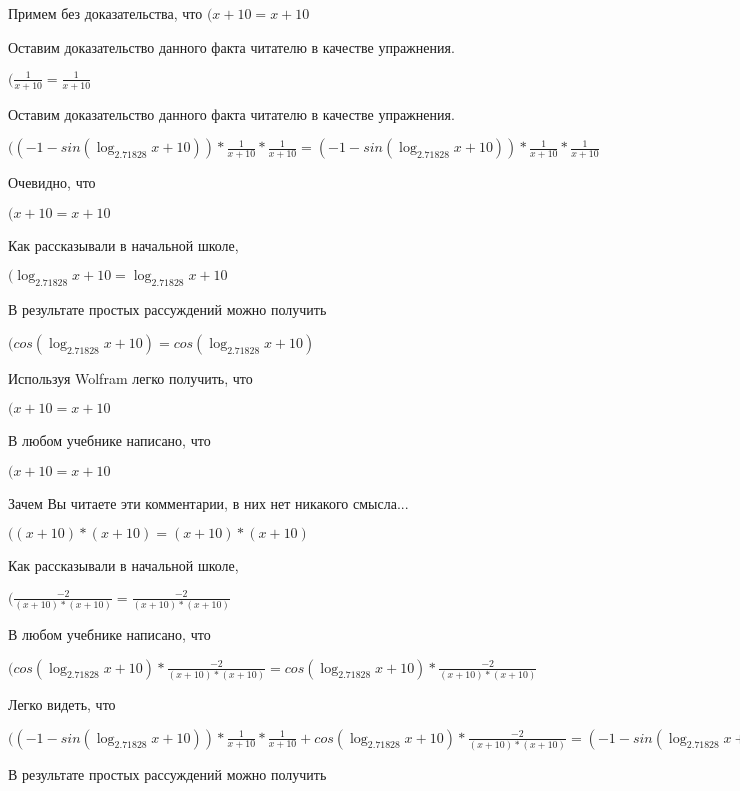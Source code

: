 \documentclass[12pt,a4paper,fleqn]{article}
\theoremstyle{definition}
\begin{document}
Примем без доказательства, что
$( x  +  10  =  x  +  10 $

Оставим доказательство данного факта читателю в качестве упражнения.

$(\frac{ 1 }{ x  +  10 }
 = \frac{ 1 }{ x  +  10 }
$

Оставим доказательство данного факта читателю в качестве упражнения.

$(( -1  - sin(\log_{ 2.71828 }{ x  +  10 })) * \frac{ 1 }{ x  +  10 }
 * \frac{ 1 }{ x  +  10 }
 = ( -1  - sin(\log_{ 2.71828 }{ x  +  10 })) * \frac{ 1 }{ x  +  10 }
 * \frac{ 1 }{ x  +  10 }
$

Очевидно, что

$( x  +  10  =  x  +  10 $

Как рассказывали в начальной школе,

$(\log_{ 2.71828 }{ x  +  10 } = \log_{ 2.71828 }{ x  +  10 }$

В результате простых рассуждений можно получить

$(cos(\log_{ 2.71828 }{ x  +  10 }) = cos(\log_{ 2.71828 }{ x  +  10 })$

Используя Wolfram легко получить, что

$( x  +  10  =  x  +  10 $

В любом учебнике написано, что

$( x  +  10  =  x  +  10 $

Зачем Вы читаете эти комментарии, в них нет никакого смысла...

$(( x  +  10 ) * ( x  +  10 ) = ( x  +  10 ) * ( x  +  10 )$

Как рассказывали в начальной школе,

$(\frac{ -2 }{( x  +  10 ) * ( x  +  10 )}
 = \frac{ -2 }{( x  +  10 ) * ( x  +  10 )}
$

В любом учебнике написано, что

$(cos(\log_{ 2.71828 }{ x  +  10 }) * \frac{ -2 }{( x  +  10 ) * ( x  +  10 )}
 = cos(\log_{ 2.71828 }{ x  +  10 }) * \frac{ -2 }{( x  +  10 ) * ( x  +  10 )}
$

Легко видеть, что

$(( -1  - sin(\log_{ 2.71828 }{ x  +  10 })) * \frac{ 1 }{ x  +  10 }
 * \frac{ 1 }{ x  +  10 }
 + cos(\log_{ 2.71828 }{ x  +  10 }) * \frac{ -2 }{( x  +  10 ) * ( x  +  10 )}
 = ( -1  - sin(\log_{ 2.71828 }{ x  +  10 })) * \frac{ 1 }{ x  +  10 }
 * \frac{ 1 }{ x  +  10 }
 + cos(\log_{ 2.71828 }{ x  +  10 }) * \frac{ -2 }{( x  +  10 ) * ( x  +  10 )}
$

В результате простых рассуждений можно получить
\end{document}
